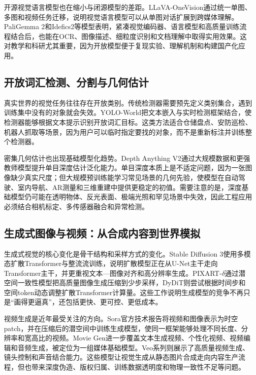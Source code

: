 \documentclass[UTF8,a4paper,12pt]{ctexart}
\newcommand{\model}[1]{\textsf{#1}}
\begin{document}
开源视觉语言模型也在缩小与闭源模型的差距。\model{LLaVA-OneVision}通过统一单图、多图和视频任务迁移，说明视觉语言模型可以从单图对话扩展到跨媒体理解\cite{llavaov}。\model{PaliGemma 2}和\model{Idefics2}等模型表明，紧凑视觉编码器、语言模型和高质量训练流程结合后，也能在OCR、图像描述、细粒度识别和文档理解中取得实用效果\cite{paligemma2,idefics2}。这对教学和科研尤其重要，因为开放模型便于复现实验、理解机制和构建国产化应用。

\subsection{开放词汇检测、分割与几何估计}
真实世界的视觉任务往往存在开放类别。传统检测器需要预先定义类别集合，遇到训练集中没有的对象就会失效。\model{YOLO-World}把文本嵌入与实时检测框架结合，使检测器能够根据文本提示识别开放词汇目标\cite{yoloworld}。这类方法适合仓储盘点、安防巡检、机器人抓取等场景，因为用户可以临时指定要找的对象，而不是重新标注并训练整个检测器。

密集几何估计也出现基础模型化趋势。\model{Depth Anything V2}通过大规模数据和更强教师模型提升单目深度估计泛化能力\cite{depthanythingv2}。单目深度本质上是不适定问题，因为一张图像缺少真实尺度；但大规模预训练能学习常见场景的几何先验，使模型在自动驾驶、室内导航、AR测量和三维重建中提供更稳定的初值。需要注意的是，深度基础模型仍可能在透明物体、反光表面、极端光照和罕见场景中失效，因此工程应用必须结合相机标定、多传感器融合和异常检测。

\subsection{生成式图像与视频：从合成内容到世界模拟}
生成式视觉的核心变化是骨干结构和采样方式的变化。\model{Stable Diffusion 3}使用多模态扩散Transformer与整流流训练，说明扩散模型正在从U-Net主干走向Transformer主干，并更重视文本—图像对齐和高分辨率生成\cite{sd3}。\model{PIXART-$\delta$}通过潜空间一致性模型把高质量图像生成压缩到少步采样\cite{pixartdelta}，\model{DyDiT}则尝试根据时间步和空间token动态调整扩散Transformer计算量\cite{dydit}。这些工作说明生成模型的竞争不再只是“画得更逼真”，还包括更快、更可控、更低成本。

视频生成是近年最受关注的方向。\model{Sora}官方技术报告将视频和图像表示为时空patch，并在压缩后的潜空间中训练生成模型，使同一框架能够处理不同长度、分辨率和宽高比的视频\cite{sora}。\model{Movie Gen}进一步覆盖文本生成视频、个性化视频、视频编辑和音频生成，被定位为一组媒体基础模型\cite{moviegen}。\model{Veo}系列则展示了高质量视频生成、镜头控制和声音结合能力\cite{veo}。这些模型让视觉生成从静态图片合成走向内容生产流程，但也带来深度伪造、版权归属、训练数据透明度和物理一致性不足等问题。
\end{document}
